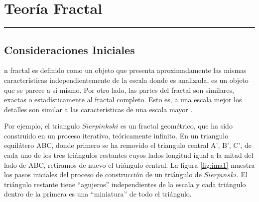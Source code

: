 
\chapter{Teoría Fractal}
\hrule \bigskip \vspace*{1cm}

\section{Consideraciones Iniciales}

n fractal es definido como un objeto que presenta aproximadamente las mismas características independientemente de la escala donde es analizada, es un objeto que se parece a si mismo. Por otro lado, las partes del fractal son similares, exactas o estadísticamente  al  fractal completo. Esto es, a una escala mejor los detalles son similar a las características de una escala mayor \cite{Schroeder:1991,traina2005using}.
 
Por ejemplo, el triangulo $Sierpinkski$ es un fractal geométrico, que ha sido construido en un proceso iterativo, teóricamente infinito.  En un triangulo equilátero ABC, donde primero se ha removido el triangulo central A', B', C',  de cada uno de los tres triángulos restantes cuyos lados longitud igual a la mitad del lado de ABC, retiramos de nuevo el triángulo central. La figura \ref{fig:ima1} muestra los pasos iniciales del proceso de construcción de un triángulo de $Sierpinski$. El triángulo restante tiene ``agujeros'' independientes de la escala y cada triángulo dentro de la primera es una ``miniatura'' de todo el triángulo.

